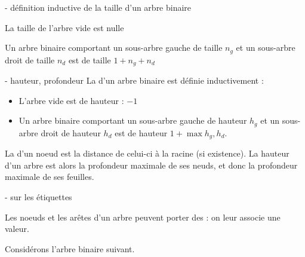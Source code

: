 \begin{remarque}{7.4}{ - définition inductive de la taille d'un arbre binaire}
    \item La taille de l'arbre vide est nulle
    \item Un arbre binaire comportant un sous-arbre gauche de taille $n_g$ et un sous-arbre droit de taille $n_d$ est de taille $1+n_g+n_d$
\end{remarque}

\begin{definition}{7.5}{ - hauteur, profondeur}
    La  d'un arbre binaire est définie inductivement : \begin{itemize}
        \item L'arbre vide est de hauteur : $-1$
        \item Un arbre binaire comportant un sous-arbre gauche de hauteur $h_g$ et un sous-arbre droit de hauteur $h_d$ est de hauteur $1+\max{h_g,h_d}$.
    \end{itemize}
    La  d'un noeud est la distance de celui-ci à la racine (si existence). La hauteur d'un arbre est alors la profondeur maximale de ses neuds, et donc la profondeur maximale de ses feuilles.
\end{definition}

\begin{remarque}{7.6}{ - sur les étiquettes}
    \item Les noeuds et les arêtes d'un arbre peuvent porter des  : on leur associe une valeur.
\end{remarque}

\begin{exemple}{7.7}{}
    \item Considérons l'arbre binaire suivant.
\end{exemple}
